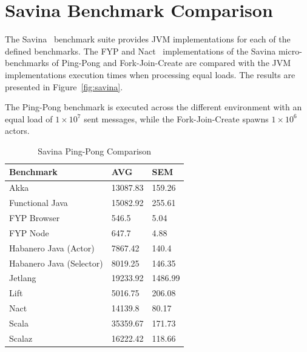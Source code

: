 \documentclass[oneside]{um-fict}
\begin{document}
\section{Savina Benchmark Comparison}
The Savina~\cite{savina} benchmark suite provides JVM implementations for each of the defined benchmarks. The FYP and Nact~\cite{nact} implementations of the Savina micro-benchmarks of Ping-Pong and Fork-Join-Create are compared with the JVM implementations execution times when processing equal loads. The results are presented in Figure~\ref{fig:savina}.

The Ping-Pong benchmark is executed across the different environment with an equal load of $1\times10^7$ sent messages, while the Fork-Join-Create spawns $1\times10^6$ actors.
\begin{table}[H]
    \begin{center}
        \begin{tabular}{|l|ll|}
        \hline
        Benchmark                & AVG  & SEM \\ \hline
        Akka                     & 13087.83 & 159.26         \\
        Functional Java          & 15082.92 & 255.61         \\
        FYP Browser              & 546.5    & 5.04           \\
        FYP Node                 & 647.7    & 4.88           \\
        Habanero Java (Actor)    & 7867.42  & 140.4          \\
        Habanero Java (Selector) & 8019.25  & 146.35         \\
        Jetlang                  & 19233.92 & 1486.99        \\
        Lift                     & 5016.75  & 206.08         \\
        Nact                     & 14139.8  & 80.17          \\
        Scala                    & 35359.67 & 171.73         \\
        Scalaz                   & 16222.42 & 118.66         \\ \hline
        \end{tabular}
        \caption{Savina Ping-Pong Comparison}\label{tab:savinapingpong}
    \end{center}
\end{table}
\end{document}
